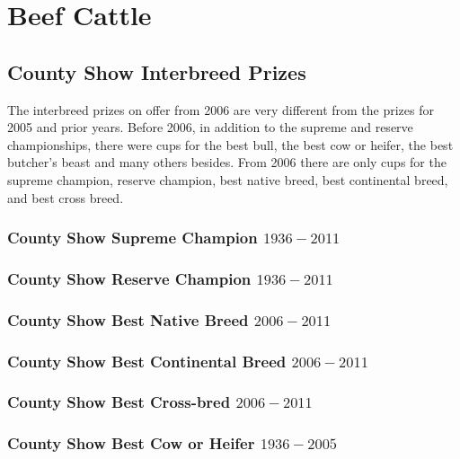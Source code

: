 \chapter{Beef Cattle}
\section[Interbreed]{County Show Interbreed Prizes}
The interbreed prizes on offer from 2006 are very different from the prizes for 2005 and prior years. Before 2006, in addition to the supreme and reserve championships, there were cups for the best bull, the best cow or heifer, the best butcher's beast and many others besides. From 2006 there are only cups for the supreme champion, reserve champion, best native breed, best continental breed, and best cross breed.
\subsection[Supreme Champion]{County Show Supreme Champion $1936 - 2011$}
\small

\normalsize
\newpage
\subsection[Reserve Champion]{County Show Reserve Champion $1936 - 2011$}
\small

\normalsize
\newpage
\subsection[Best Native Breed $2006 - 2011$]{County Show Best Native Breed $2006 - 2011$}
\small

\normalsize
\newpage
\subsection[Best Continental Breed $2006 - 2011$]{County Show Best Continental Breed $2006 - 2011$}
\small

\normalsize
\newpage
\subsection[Best Cross-bred $2006 - 2011$]{County Show Best Cross-bred $2006 - 2011$}
\small

\normalsize
\newpage
\subsection[Best Cow or Heifer $1936 - 2005$]{County Show Best Cow or Heifer $1936 - 2005$}
\small

\normalsize
\newpage
